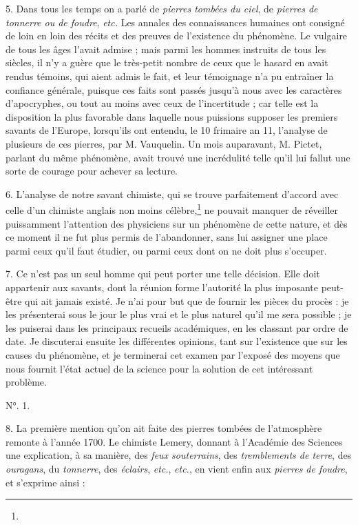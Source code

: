 \documentclass[a4paper, 11pt, oneside, polutonikogreek, french]{article}
\begin{document}
5. Dans tous les temps on a parlé de \emph{pierres tombées du ciel}, de \emph{pierres de tonnerre ou de foudre}, \emph{etc.} Les annales des connaissances humaines ont consigné de loin en loin des récits et des preuves de l'existence du phénomène. Le vulgaire de tous les âges l'avait admise ; mais parmi les hommes instruits de tous les siècles, il n'y a guère que le très-petit nombre de ceux que le hasard en avait rendus témoins, qui aient admis le fait, et leur témoignage n'a pu entraîner la confiance générale, puisque ces faits sont passés jusqu'à nous avec les caractères d'apocryphes, ou tout au moins avec ceux de l'incertitude ; car telle est la disposition la plus favorable dans laquelle nous puissions supposer les premiers savants de l'Europe, lorsqu'ils ont entendu, le 10 frimaire an 11, l'analyse de plusieurs de ces pierres, par M. Vauquelin. Un mois auparavant, M. Pictet, parlant du même phénomène, avait trouvé une incrédulité telle qu'il lui fallut une sorte de courage pour achever sa lecture.

6. L'analyse de notre savant chimiste, qui se trouve parfaitement d'accord avec celle d'un chimiste anglais non moins célèbre,\footnote{} ne pouvait manquer de réveiller puissamment l'attention des physiciens sur un phénomène de cette nature, et dès ce moment il ne fut plus permis de l'abandonner, sans lui assigner une place parmi ceux qu'il faut étudier, ou parmi ceux dont on ne doit plus s'occuper.

7. Ce n'est pas un seul homme qui peut porter une telle décision. Elle doit appartenir aux savants, dont la réunion forme l'autorité la plus imposante peut-être qui ait jamais existé. Je n'ai pour but que de fournir les pièces du procès : je les présenterai sous le jour le plus vrai et le plus naturel qu'il me sera possible ; je les puiserai dans les principaux recueils académiques, en les classant par ordre de date. Je discuterai ensuite les différentes opinions, tant sur l'existence que sur les causes du phénomène, et je terminerai cet examen par l'exposé des moyens que nous fournit l'état actuel de la science pour la solution de cet intéressant problème.

\begin{center}
N°. 1.
\end{center}

8. La première mention qu'on ait faite des pierres tombées de l'atmosphère remonte à l'année 1700. Le chimiste Lemery, donnant à l'Académie des Sciences une explication, à sa manière, des \emph{feux souterrains}, des \emph{tremblements de terre}, des \emph{ouragans}, du \emph{tonnerre}, des \emph{éclairs}, \emph{etc.}, \emph{etc.}, en vient enfin aux \emph{pierres de foudre}, et s'exprime ainsi :
\end{document}
